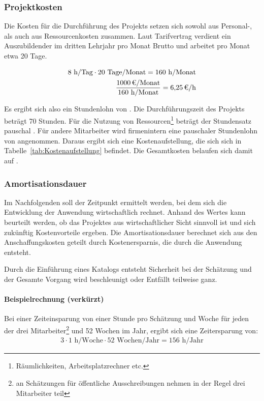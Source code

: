 \subsubsection{Projektkosten}
\label{sec:Projektkosten}

Die Kosten für die Durchführung des Projekts setzen sich sowohl aus Personal-,
als auch aus Ressourcenkosten zusammen. Laut Tarifvertrag verdient ein
Auszubildender im dritten Lehrjahr pro Monat  Brutto und arbeitet pro
Monat etwa 20 Tage.

\begin{eqnarray*}
8 \mbox{ h/Tag} \cdot 20 \mbox{ Tage/Monat} = 160 \mbox{ h/Monat}\\
\frac{\eur{1000} \mbox{/Monat}}{160 \mbox{ h/Monat}} = \eur{6,25}\mbox{/h}
\end{eqnarray*}

Es ergibt sich also ein Stundenlohn von . 
Die Durchführungszeit des Projekts beträgt 70 Stunden. Für die Nutzung von
Ressourcen\footnote{Räumlichkeiten, Arbeitsplatzrechner etc.} beträgt der
Stundensatz pauschal . Für andere Mitarbeiter wird firmenintern
eine pauschaler Stundenlohn von  angenommen. Daraus ergibt sich eine
Kostenaufstellung, die sich sich in
Tabelle~\ref{tab:Kostenaufstellung} befindet.
Die Gesamtkosten belaufen sich damit auf .

\subsubsection{Amortisationsdauer}
\label{sec:Amortisationsdauer}
Im Nachfolgenden soll der Zeitpunkt ermittelt werden, bei dem sich die
Entwicklung der Anwendung wirtschaftlich rechnet. Anhand des Wertes kann
beurteilt werden, ob das Projektes aus wirtschaftlicher Sicht sinnvoll ist und
sich zukünftig Kostenvorteile ergeben. Die Amortisationsdauer berechnet sich aus
den Anschaffungskosten geteilt durch Kostenersparnis, die durch die Anwendung
entsteht.

Durch die Einführung eines Katalogs entsteht Sicherheit bei der Schätzung und
der Gesamte Vorgang wird beschleunigt oder Entfällt teilweise ganz.

\paragraph{Beispielrechnung (verkürzt)}
Bei einer Zeiteinsparung von einer Stunde pro Schätzung und Woche für jeden der
drei Mitarbeiter\footnote{an Schätzungen für öffentliche Ausschreibungen nehmen
in der Regel drei Mitarbeiter teil} und 52 Wochen im Jahr, ergibt sich eine
Zeitersparung von:
\begin{eqnarray*}
3 \cdot 1 \mbox{ h/Woche} \cdot 52 \mbox{ Wochen/Jahr} = 156 \mbox{ h/Jahr}
\end{eqnarray*}

